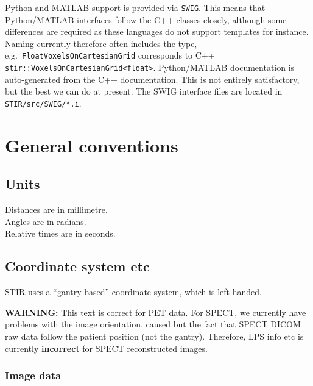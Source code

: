 \documentclass{article}
\def\R2Lurl#1#2{\mbox{\href{#1}{\tt #2}}}
\begin{document}
Python and MATLAB support is provided via \R2Lurl{http://www.swig.org/}{SWIG}. This means that Python/MATLAB interfaces follow
the C++ classes closely, although some differences are required as these languages do not support templates for instance.
Naming currently therefore often includes the type, e.g.~\texttt{FloatVoxelsOnCartesianGrid} corresponds to
C++ \texttt{stir::VoxelsOnCartesianGrid<float>}. Python/MATLAB documentation is auto-generated from the C++
documentation. This is not entirely satisfactory, but the best we can do at present.
The SWIG interface files are located in \texttt{STIR/src/SWIG/*.i}.

\section{
General conventions}



\subsection{
Units }

Distances are in millimetre.\\
Angles are in radians.\\
Relative times are in seconds.

\subsection{
Coordinate system etc}
STIR uses a ``gantry-based'' coordinate system, which is left-handed.

\textbf{WARNING:} This text is correct for PET data. For SPECT, we currently have problems with the image orientation, caused
but the fact that SPECT DICOM raw data follow the patient position (not the gantry). Therefore, LPS info etc is currently
\textbf{incorrect} for SPECT reconstructed images.

\subsubsection{Image data }
\end{document}
